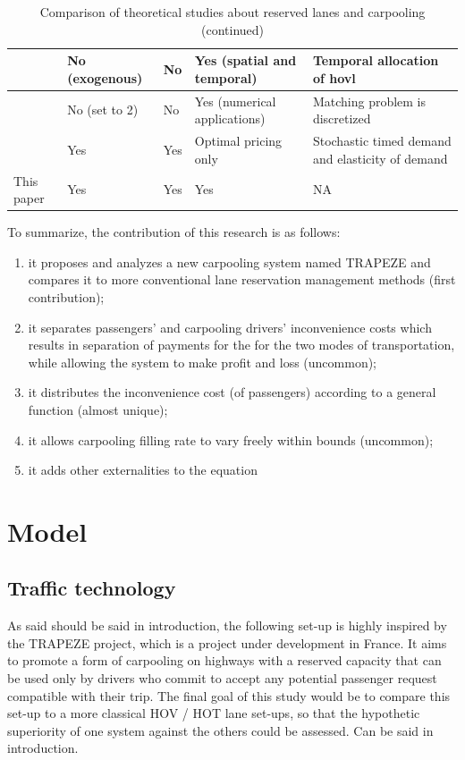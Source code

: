 \documentclass[english, a4paper]{article}
\theoremstyle{plain}
\theoremstyle{definition}
\theoremstyle{remark}
\begin{document}
\begin{table}
\begin{tabular}{|m{}||m{}|m{}|m{}|m{}|}
        \cite{xiao_temporal-spatial_2021} & No (exogenous) & No & Yes (spatial and temporal) & Temporal allocation of \acrshort{hovl}\\\hline
        \cite{de_palma_influence_2022} & No (set to 2) & No & Yes (numerical applications) & Matching problem is discretized \\\hline
        \cite{leurent_what_2024} & Yes & Yes & Optimal pricing only & Stochastic timed demand and elasticity of demand\\\hline
        This paper & Yes & Yes & Yes & NA \\\hline
    \end{tabular}
    \caption{Comparison of theoretical studies about reserved lanes and carpooling (continued)}
    \label{table:hov_theoretical_studies2}
\end{table}

To summarize, the contribution of this research is as follows:
\begin{enumerate}
    \item it proposes and analyzes a new carpooling system named TRAPEZE and compares it to more conventional lane reservation management methods (first contribution);
    \item it separates passengers’ and carpooling drivers’ inconvenience costs which results in separation of payments for the for the two modes of transportation, while allowing the system to make profit and loss (uncommon);
    \item it distributes the inconvenience cost (of passengers) according to a general function (almost unique);
    \item it allows carpooling filling rate to vary freely within bounds (uncommon);
    \item it adds other externalities to the equation
\end{enumerate}



\section{Model}
\subsection{Traffic technology}

As said \alert{should be said in introduction}, the following set-up is highly inspired by the TRAPEZE project, which is a project under development in France. It aims to promote a form of carpooling on highways with a reserved capacity that can be used only by drivers who commit to accept any potential passenger request compatible with their trip. \alert{The final goal of this study would be to compare this set-up to a more classical HOV / HOT lane set-ups, so that the hypothetic superiority of one system against the others could be assessed}.
\alert{Can be said in introduction}.
\end{document}
